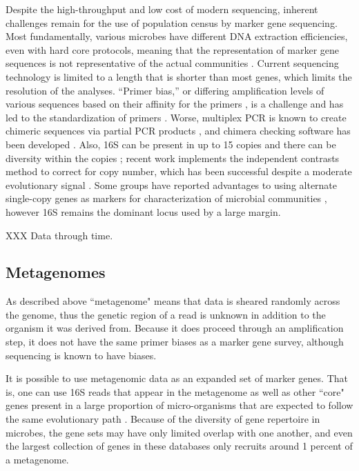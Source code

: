 \documentclass{amsart}
\begin{document}
Despite the high-throughput and low cost of modern sequencing, inherent challenges remain for the use of population census by marker gene sequencing.
Most fundamentally, various microbes have different DNA extraction efficiencies, even with hard core protocols, meaning that the representation of marker gene sequences is not representative of the actual communities \citep{morgan2010metagenomic}.
Current sequencing technology is limited to a length that is shorter than most genes, which limits the resolution of the analyses.
``Primer bias,'' or differing amplification levels of various sequences based on their affinity for the primers \citep{suzuki1996bias,polz1998bias}, is a challenge and has led to the standardization of primers \citep{methe2012framework}.
Worse, multiplex PCR is known to create chimeric sequences via partial PCR products \citep{hugenholtz2003chimeric,ashelford2005least,haas2011chimeric,schloss2011reducing}, and chimera checking software has been developed \citep[including][]{ashelford2006new,edgar2011uchime}.
Also, 16S can be present in up to 15 copies and there can be diversity within the copies \citep{klappenbach2001rrndb};
recent work \citep{kembel2012incorporating} implements the independent contrasts \citep{felsenstein1985phylogenies} method to correct for copy number, which has been successful despite a moderate evolutionary signal \citep{klappenbach2000rrna}.
Some groups have reported advantages to using alternate single-copy genes as markers for characterization of microbial communities \citep[e.g.][]{case2007rpob,mcnabb2004hsp65}, however 16S remains the dominant locus used by a large margin.

XXX Data through time.

\subsection{Metagenomes}
As described above ``metagenome" means that data is sheared randomly across the genome, thus the genetic region of a read is unknown in addition to the organism it was derived from.
Because it does proceed through an amplification step, it does not have the same primer biases as a marker gene survey, although sequencing is known to have biases.

It is possible to use metagenomic data as an expanded set of marker genes.
That is, one can use 16S reads that appear in the metagenome as well as other ``core" genes present in a large proportion of micro-organisms that are expected to follow the same evolutionary path \citep{von2007quantitative,wu2008amphora,stark2010mltreemap,kembel2011phylogenetic}.
Because of the diversity of gene repertoire in microbes, the gene sets may have only limited overlap with one another, and even the largest collection of genes in these databases only recruits around 1 percent of a metagenome.
\end{document}
